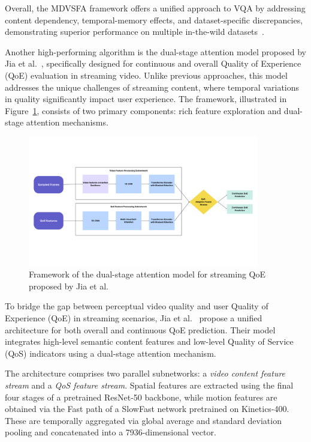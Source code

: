 Overall, the MDVSFA framework offers a unified approach to VQA by addressing content dependency, temporal-memory effects, and dataset-specific discrepancies, demonstrating superior performance on multiple in-the-wild datasets~\cite{li2023unified}.

Another high-performing algorithm is the dual-stage attention model proposed by Jia et al.~\cite{jia2024continuous}, specifically designed for continuous and overall Quality of Experience (QoE) evaluation in streaming video. Unlike previous approaches, this model addresses the unique challenges of streaming content, where temporal variations in quality significantly impact user experience. The framework, illustrated in Figure~\ref{fig:framework3}, consists of two primary components: rich feature exploration and dual-stage attention mechanisms.

\begin{figure}
\centering
\includegraphics[width=0.9\textwidth]{figures/dual-attention-framework.png}
\caption{Framework of the dual-stage attention model for streaming QoE proposed by Jia et al.~\cite{jia2024continuous}}
\label{fig:framework3}
\end{figure}

To bridge the gap between perceptual video quality and user Quality of Experience (QoE) in streaming scenarios, Jia et al.~\cite{jia2024continuous} propose a unified architecture for both overall and continuous QoE prediction. Their model integrates high-level semantic content features and low-level Quality of Service (QoS) indicators using a dual-stage attention mechanism. 

The architecture comprises two parallel subnetworks: a \textit{video content feature stream} and a \textit{QoS feature stream}. Spatial features are extracted using the final four stages of a pretrained ResNet-50 backbone, while motion features are obtained via the Fast path of a SlowFast network pretrained on Kinetics-400. These are temporally aggregated via global average and standard deviation pooling and concatenated into a 7936-dimensional vector.

